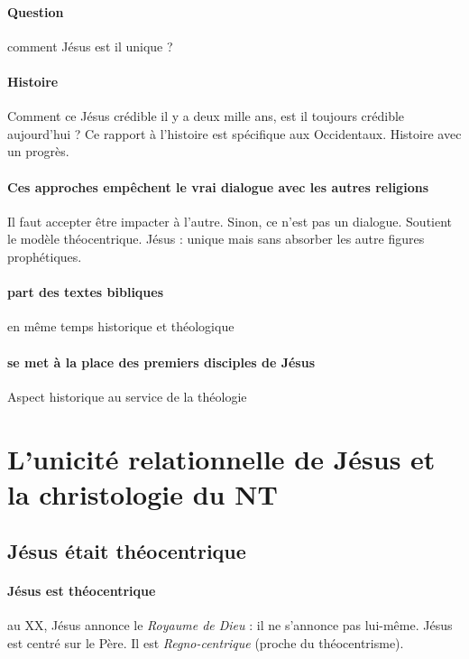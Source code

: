 \paragraph{Question} comment Jésus est il unique ? 

\paragraph{Histoire} Comment ce Jésus crédible il y a deux mille ans, est il toujours crédible aujourd'hui ? Ce rapport à l'histoire est spécifique aux Occidentaux. Histoire avec un progrès.

\paragraph{Ces approches empêchent le vrai dialogue avec les autres religions} Il faut accepter être impacter à l'autre. Sinon, ce n'est pas un dialogue. Soutient le modèle théocentrique. Jésus : unique mais sans absorber les autre figures prophétiques. 


\paragraph{part des textes bibliques} en même temps historique et théologique


\paragraph{se met à la place des premiers disciples de Jésus} Aspect historique au service de la théologie

\section{L’unicité relationnelle de Jésus et la christologie du NT}
\subsection{Jésus était théocentrique}
 
 
\paragraph{Jésus est théocentrique} au XX, Jésus annonce le \textit{Royaume de Dieu} : il ne s'annonce pas lui-même. 
Jésus est centré sur le Père. Il est \textit{Regno-centrique} (proche du théocentrisme). 

